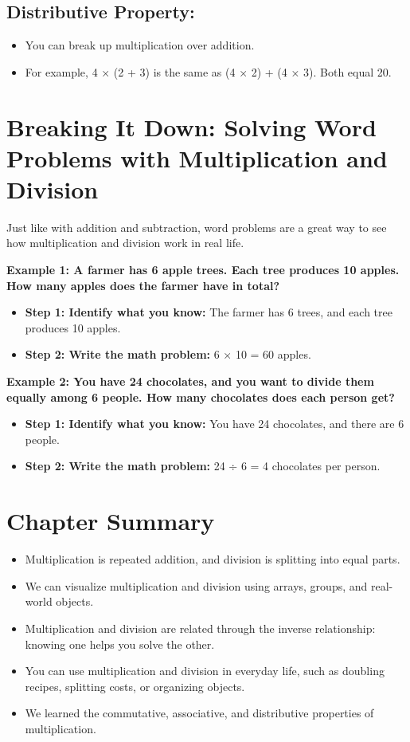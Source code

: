 \subsection{Distributive Property:}
\begin{itemize}
    \item You can break up multiplication over addition.
    \item For example, 4 × (2 + 3) is the same as (4 × 2) + (4 × 3). Both equal 20.
\end{itemize}

\section{Breaking It Down: Solving Word Problems with Multiplication and Division}
Just like with addition and subtraction, word problems are a great way to see how multiplication and division work in real life.

\textbf{Example 1: A farmer has 6 apple trees. Each tree produces 10 apples. How many apples does the farmer have in total?}
\begin{itemize}
    \item \textbf{Step 1: Identify what you know:}
        The farmer has 6 trees, and each tree produces 10 apples.
    \item \textbf{Step 2: Write the math problem:}
        6 × 10 = 60 apples.    
\end{itemize}

\textbf{Example 2: You have 24 chocolates, and you want to divide them equally among 6 people. How many chocolates does each person get?}
\begin{itemize}
    \item \textbf{Step 1: Identify what you know:}
        You have 24 chocolates, and there are 6 people.
    \item \textbf{Step 2: Write the math problem:}
        24 ÷ 6 = 4 chocolates per person.
\end{itemize}

\section{Chapter Summary}
\begin{itemize}
    \item Multiplication is repeated addition, and division is splitting into equal parts.
    \item We can visualize multiplication and division using arrays, groups, and real-world objects.
    \item Multiplication and division are related through the inverse relationship: knowing one helps you solve the other.
    \item You can use multiplication and division in everyday life, such as doubling recipes, splitting costs, or organizing objects.
    \item We learned the commutative, associative, and distributive properties of multiplication.
\end{itemize}

